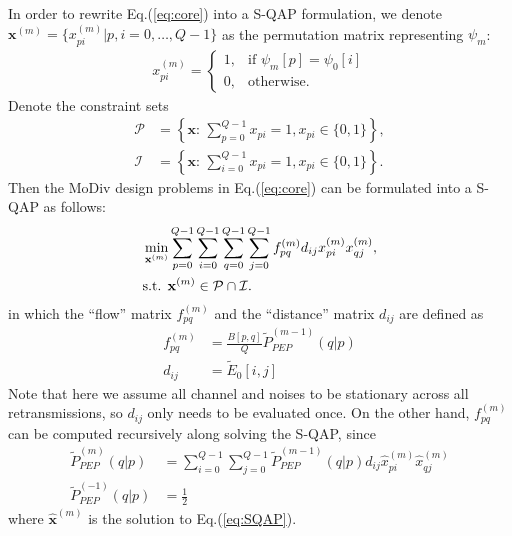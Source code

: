 \documentclass{article}
\begin{document}
In order to rewrite Eq.(\ref{eq:core}) into a S-QAP formulation, we
denote $\mathbf{x}^{(m)} = \{x_{pi}^{(m)}|p,i=0,\ldots,Q-1\}$ as the
permutation matrix representing $\psi_m$:
\begin{align}
  x_{pi}^{(m)} = \left\{\begin{array}{ll}
        1,& \mbox{if $\psi_m[p] = \psi_0[i]$}\\
        0,& \mbox{otherwise.} 
   \end{array} \right.
\end{align}
Denote the constraint sets
\begin{subequations}
  \begin{align}
    \mathcal{P} & = \left\{\mathbf{x}:\,\sum_{p=0}^{Q-1}x_{pi} = 1,
    x_{pi}\in\{0, 1\}\right\}, \\
    \mathcal{I} & = \left\{\mathbf{x}:\,\sum_{i=0}^{Q-1}x_{pi} = 1,
    x_{pi}\in\{0, 1\}\right\}. 
    \label{eq:constraint}
  \end{align}
\end{subequations}
Then the MoDiv design problems in Eq.(\ref{eq:core}) can be formulated into a
S-QAP as follows:
\begin{align}
  & \min_{\mathbf{x}^{(m)}}\sum_{p=0}^{Q-1}\sum_{i=0}^{Q-1}
  \sum_{q=0}^{Q-1}\sum_{j=0}^{Q-1}f_{pq}^{(m)}d_{ij}x_{pi}^{(m)}x_{qj}^{(m)},
  \label{eq:SQAP}\\
  & \mbox{s.t. } \mathbf{x}^{(m)}\in \mathcal{P}\cap\mathcal{I}. \notag
\end{align}
in which the ``flow'' matrix $f_{pq}^{(m)}$ and the ``distance'' matrix $d_{ij}$
are defined as
\begin{subequations}
  \begin{align}
    f_{pq}^{(m)} & = \frac{B[p,q]}{Q}\tilde{P}_{PEP}^{(m-1)}(q|p) \\
    d_{ij}  & = \tilde{E}_0[i,j]
  \end{align}
\end{subequations}
Note that here we assume all channel and noises to be stationary across all
retransmissions, so $d_{ij}$ only needs to be evaluated once. On the other hand,
$f_{pq}^{(m)}$ can be computed recursively along solving the S-QAP, since
\begin{subequations}
  \begin{align}
    \tilde{P}_{PEP}^{(m)}(q|p) & = \sum_{i=0}^{Q-1}
    \sum_{j=0}^{Q-1}\tilde{P}_{PEP}^{(m-1)}(q|p)d_{ij}\hat{x}_{pi}^{(m)}\hat{x}_{qj}^{(m)}
    \\
    \tilde{P}_{PEP}^{(-1)}(q|p) & = \frac{1}{2}
  \end{align}
\end{subequations}
where $\hat{\mathbf{x}}^{(m)}$ is the solution to Eq.(\ref{eq:SQAP}). 
\end{document}
